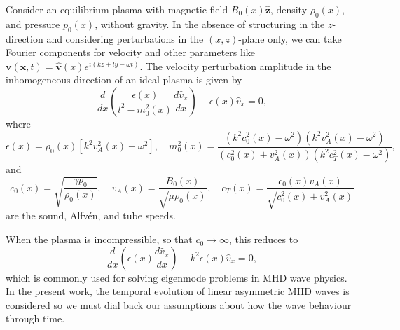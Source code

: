 \documentclass{aastex61}
\begin{document}
Consider an equilibrium plasma with magnetic field $B_0(x)\mathbf{\hat{z}}$, density $\rho_0(x)$, and pressure $p_0(x)$, without gravity. In the absence of structuring in the $z$-direction and considering perturbations in the $(x,z)$-plane only, we can take Fourier components for velocity and other parameters like $\mathbf{v}(\mathbf{x},t) = \mathbf{\hat{v}}(x)e^{i(kz + ly - \omega t)}$. The velocity perturbation amplitude in the inhomogeneous direction of an ideal plasma is given by
\begin{equation}
\frac{d}{dx}\left(\frac{\epsilon(x)}{l^2 - m_0^2(x)} \frac{d\hat{v}_x}{dx}\right) - \epsilon(x)\hat{v}_x = 0,
\end{equation}
where
\begin{equation}
\epsilon(x) = \rho_0(x)[k^2v_A^2(x)-\omega^2], \quad
m_0^2(x) = \frac{(k^2c_0^2(x) - \omega^2)(k^2v_A^2(x) - \omega^2)}{(c_0^2(x) + v_A^2(x))(k^2c_T^2(x) - \omega^2)},
\end{equation}
and
\begin{equation}
c_0(x) = \sqrt{\frac{\gamma p_0}{\rho_0(x)}}, \quad
v_A(x) = \frac{B_0(x)}{\sqrt{\mu \rho_0(x)}}, \quad
c_T(x) = \frac{c_0(x)v_A(x)}{\sqrt{c_0^2(x) + v_A^2(x)}}
\end{equation} are the sound, Alfv\'{e}n, and tube speeds.

When the plasma is incompressible, so that $c_0 \to \infty$, this reduces to
\begin{equation}
\frac{d}{dx}\left(\epsilon(x) \frac{d\hat{v}_x}{dx}\right) - k^2\epsilon(x)\hat{v}_x = 0,
\label{gov}
\end{equation}
which is commonly used for solving eigenmode problems in MHD wave physics. In the present work, the temporal evolution of linear asymmetric MHD waves is considered so we must dial back our assumptions about how the wave behaviour through time.
\end{document}
